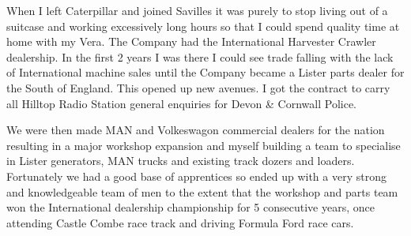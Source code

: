 When I left Caterpillar and joined Savilles it was purely to stop living out of
a suitcase and working excessively long hours so that I could spend quality
time at home with my Vera.  The Company had the International Harvester Crawler
dealership.  In the first 2 years I was there I could see trade falling with
the lack of International machine sales until the Company became a Lister parts
dealer for the South of England.  This opened up new avenues.  I got the
contract to carry all Hilltop Radio Station general enquiries for Devon \&
Cornwall Police.

We were then made MAN and Volkeswagon commercial dealers for the nation
resulting in a major workshop expansion and myself building a team to
specialise in Lister generators, MAN trucks and existing track dozers and
loaders.  Fortunately we had a good base of apprentices so ended up with a very
strong and knowledgeable team of men to the extent that the workshop and parts
team won the International dealership championship for 5 consecutive years,
once attending Castle Combe race track and driving Formula Ford race cars.

